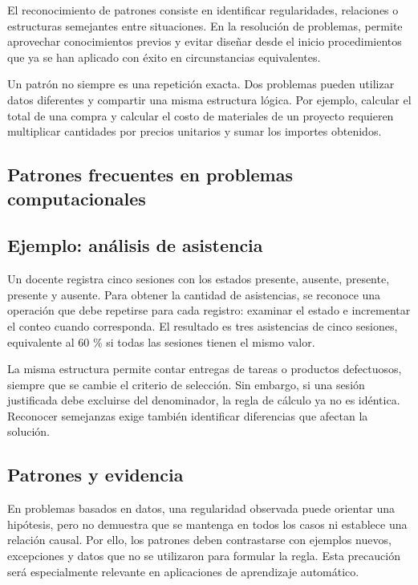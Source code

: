 El reconocimiento de patrones consiste en identificar regularidades, relaciones o estructuras semejantes entre situaciones. En la resolución de problemas, permite aprovechar conocimientos previos y evitar diseñar desde el inicio procedimientos que ya se han aplicado con éxito en circunstancias equivalentes.

Un patrón no siempre es una repetición exacta. Dos problemas pueden utilizar datos diferentes y compartir una misma estructura lógica. Por ejemplo, calcular el total de una compra y calcular el costo de materiales de un proyecto requieren multiplicar cantidades por precios unitarios y sumar los importes obtenidos.

\subsection{Patrones frecuentes en problemas computacionales}



\subsection{Ejemplo: análisis de asistencia}

Un docente registra cinco sesiones con los estados presente, ausente, presente, presente y ausente. Para obtener la cantidad de asistencias, se reconoce una operación que debe repetirse para cada registro: examinar el estado e incrementar el conteo cuando corresponda. El resultado es tres asistencias de cinco sesiones, equivalente al 60 \% si todas las sesiones tienen el mismo valor.

La misma estructura permite contar entregas de tareas o productos defectuosos, siempre que se cambie el criterio de selección. Sin embargo, si una sesión justificada debe excluirse del denominador, la regla de cálculo ya no es idéntica. Reconocer semejanzas exige también identificar diferencias que afectan la solución.

\subsection{Patrones y evidencia}

En problemas basados en datos, una regularidad observada puede orientar una hipótesis, pero no demuestra que se mantenga en todos los casos ni establece una relación causal. Por ello, los patrones deben contrastarse con ejemplos nuevos, excepciones y datos que no se utilizaron para formular la regla. Esta precaución será especialmente relevante en aplicaciones de aprendizaje automático.

